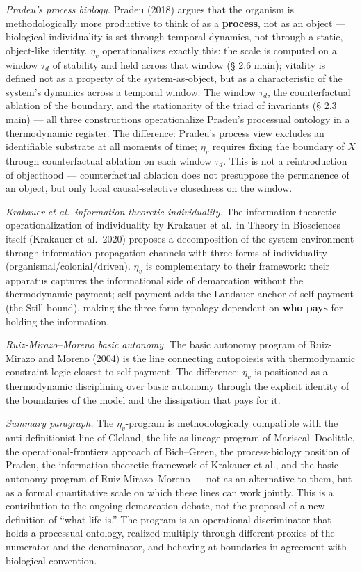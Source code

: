 \documentclass[pdflatex,sn-mathphys-ay]{sn-jnl}
\begin{document}
\emph{Pradeu's process biology.} Pradeu (2018) argues that the organism is methodologically more productive to think of as a \textbf{process}, not as an object --- biological individuality is set through temporal dynamics, not through a static, object-like identity. \(\eta_v\) operationalizes exactly this: the scale is computed on a window \(\tau_d\) of stability and held across that window (§ 2.6 main); vitality is defined not as a property of the system-as-object, but as a characteristic of the system's dynamics across a temporal window. The window \(\tau_d\), the counterfactual ablation of the boundary, and the stationarity of the triad of invariants (§ 2.3 main) --- all three constructions operationalize Pradeu's processual ontology in a thermodynamic register. The difference: Pradeu's process view excludes an identifiable substrate at all moments of time; \(\eta_v\) requires fixing the boundary of \(X\) through counterfactual ablation on each window \(\tau_d\). This is not a reintroduction of objecthood --- counterfactual ablation does not presuppose the permanence of an object, but only local causal-selective closedness on the window.

\emph{Krakauer et al.~information-theoretic individuality.} The information-theoretic operationalization of individuality by Krakauer et al.~in Theory in Biosciences itself (Krakauer et al.~2020) proposes a decomposition of the system-environment through information-propagation channels with three forms of individuality (organismal/colonial/driven). \(\eta_v\) is complementary to their framework: their apparatus captures the informational side of demarcation without the thermodynamic payment; self-payment adds the Landauer anchor of self-payment (the Still bound), making the three-form typology dependent on \textbf{who pays} for holding the information.

\emph{Ruiz-Mirazo--Moreno basic autonomy.} The basic autonomy program of Ruiz-Mirazo and Moreno (2004) is the line connecting autopoiesis with thermodynamic constraint-logic closest to self-payment. The difference: \(\eta_v\) is positioned as a thermodynamic disciplining over basic autonomy through the explicit identity of the boundaries of the model and the dissipation that pays for it.

\emph{Summary paragraph.} The \(\eta_v\)-program is methodologically compatible with the anti-definitionist line of Cleland, the life-as-lineage program of Mariscal--Doolittle, the operational-frontiers approach of Bich--Green, the process-biology position of Pradeu, the information-theoretic framework of Krakauer et al., and the basic-autonomy program of Ruiz-Mirazo--Moreno --- not as an alternative to them, but as a formal quantitative scale on which these lines can work jointly. This is a contribution to the ongoing demarcation debate, not the proposal of a new definition of ``what life is.'' The program is an operational discriminator that holds a processual ontology, realized multiply through different proxies of the numerator and the denominator, and behaving at boundaries in agreement with biological convention.
\end{document}
